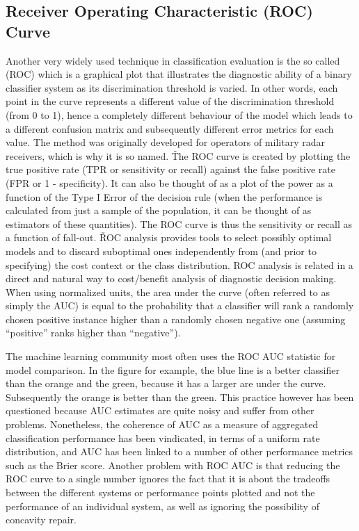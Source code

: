 \subsection{Receiver Operating Characteristic (ROC) Curve}

Another very widely used technique in classification evaluation is the so called  (ROC) which is a graphical plot that illustrates the diagnostic ability of a binary classifier
system as its discrimination threshold is varied. In other words, each point in the curve represents a different
value of the discrimination threshold (from 0 to 1), hence a completely different behaviour of the model which leads
to a different confusion matrix and subsequently different error metrics for each value. The method was originally
developed for operators of military radar receivers, which is why it is so named. \v

The ROC curve is created by plotting the true positive rate (TPR or sensitivity or recall) against the false positive
rate (FPR or 1 - specificity). It can also be thought of as a plot of the power as a function of the Type I Error of
the decision rule (when the performance is calculated from just a sample of the population, it can be thought of as
estimators of these quantities). The ROC curve is thus the sensitivity or recall as a function of fall-out. \v

ROC analysis provides tools to select possibly optimal models and to discard suboptimal ones independently from (and
prior to specifying) the cost context or the class distribution. ROC analysis is related in a direct and natural way
to cost/benefit analysis of diagnostic decision making. \v

When using normalized units, the area under the curve (often referred to as simply the AUC) is equal to the
probability that a classifier will rank a randomly chosen positive instance higher than a randomly chosen negative
one (assuming ``positive'' ranks higher than ``negative'').


The machine learning community most often uses the ROC AUC statistic for model comparison. In the figure for example,
the blue line is a better classifier than the orange and the green, because it has a larger are under the curve.
Subsequently the orange is better than the green. This practice however has been questioned because AUC estimates are
quite noisy and suffer from other problems. Nonetheless, the coherence of AUC as a measure of aggregated
classification performance has been vindicated, in terms of a uniform rate distribution, and AUC has been linked to a
number of other performance metrics such as the Brier score. Another problem with ROC AUC is that reducing the ROC
curve to a single number ignores the fact that it is about the tradeoffs between the different systems or performance
points plotted and not the performance of an individual system, as well as ignoring the possibility of concavity repair.

